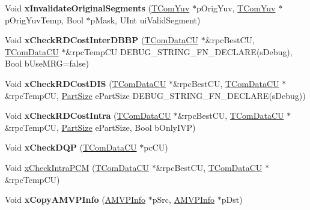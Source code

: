 \begin{DoxyCompactItemize}
\mbox{\label{class_t_enc_cu_a81b73a5b7eb836a1497558ca870829db}} 
Void {\bfseries x\+Invalidate\+Original\+Segments} (\hyperlink{class_t_com_yuv}{T\+Com\+Yuv} $\ast$p\+Orig\+Yuv, \hyperlink{class_t_com_yuv}{T\+Com\+Yuv} $\ast$p\+Orig\+Yuv\+Temp, Bool $\ast$p\+Mask, U\+Int ui\+Valid\+Segment)
\item 
\mbox{\label{class_t_enc_cu_a755a00d3bfb1702de2b97213a019cfa2}} 
Void {\bfseries x\+Check\+R\+D\+Cost\+Inter\+D\+B\+BP} (\hyperlink{class_t_com_data_c_u}{T\+Com\+Data\+CU} $\ast$\&rpc\+Best\+CU, \hyperlink{class_t_com_data_c_u}{T\+Com\+Data\+CU} $\ast$\&rpc\+Temp\+CU D\+E\+B\+U\+G\+\_\+\+S\+T\+R\+I\+N\+G\+\_\+\+F\+N\+\_\+\+D\+E\+C\+L\+A\+RE(s\+Debug), Bool b\+Use\+M\+RG=false)
\item 
\mbox{\label{class_t_enc_cu_a4335f388216b3a6f578daceb69dcd777}} 
Void {\bfseries x\+Check\+R\+D\+Cost\+D\+IS} (\hyperlink{class_t_com_data_c_u}{T\+Com\+Data\+CU} $\ast$\&rpc\+Best\+CU, \hyperlink{class_t_com_data_c_u}{T\+Com\+Data\+CU} $\ast$\&rpc\+Temp\+CU, \hyperlink{_type_def_8h_a0093b7809f3cfae06fda9d67441267bd}{Part\+Size} e\+Part\+Size D\+E\+B\+U\+G\+\_\+\+S\+T\+R\+I\+N\+G\+\_\+\+F\+N\+\_\+\+D\+E\+C\+L\+A\+RE(s\+Debug))
\item 
\mbox{\label{class_t_enc_cu_a22a16aee76b94f666a8ab4039df88df2}} 
Void {\bfseries x\+Check\+R\+D\+Cost\+Intra} (\hyperlink{class_t_com_data_c_u}{T\+Com\+Data\+CU} $\ast$\&rpc\+Best\+CU, \hyperlink{class_t_com_data_c_u}{T\+Com\+Data\+CU} $\ast$\&rpc\+Temp\+CU, \hyperlink{_type_def_8h_a0093b7809f3cfae06fda9d67441267bd}{Part\+Size} e\+Part\+Size, Bool b\+Only\+I\+VP)
\item 
\mbox{\label{class_t_enc_cu_a9208726da73b98dc373c5f20a2a522a4}} 
Void {\bfseries x\+Check\+D\+QP} (\hyperlink{class_t_com_data_c_u}{T\+Com\+Data\+CU} $\ast$pc\+CU)
\item 
Void \hyperlink{class_t_enc_cu_ad2a4b94cc47ed04a206961d983ffa263}{x\+Check\+Intra\+P\+CM} (\hyperlink{class_t_com_data_c_u}{T\+Com\+Data\+CU} $\ast$\&rpc\+Best\+CU, \hyperlink{class_t_com_data_c_u}{T\+Com\+Data\+CU} $\ast$\&rpc\+Temp\+CU)
\item 
\mbox{\label{class_t_enc_cu_a11138a8d27814145d8287a3e01dff26e}} 
Void {\bfseries x\+Copy\+A\+M\+V\+P\+Info} (\hyperlink{_t_com_motion_info_8h_a4dfe7465dec69a9356d5166304173f8c}{A\+M\+V\+P\+Info} $\ast$p\+Src, \hyperlink{_t_com_motion_info_8h_a4dfe7465dec69a9356d5166304173f8c}{A\+M\+V\+P\+Info} $\ast$p\+Dst)

\end{DoxyCompactItemize}
